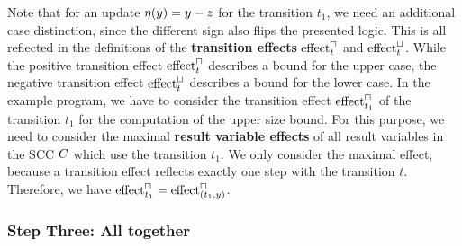 Note that for an update $\eta(y) = y - z$ for the transition $t_1$, we need an additional case distinction, since the different sign also flips the presented logic.
This is all reflected in the definitions of the \textbf{transition effects} $\text{effect}^\sqcap_t$ and $\text{effect}^\sqcup_t$.
While the positive transition effect $\text{effect}^\sqcap_t$ describes a bound for the upper case, the negative transition effect $\text{effect}^\sqcup_t$ describes a bound for the lower case.
In the example program, we have to consider the transition effect $\text{effect}^\sqcap_{t_1}$ of the transition $t_1$ for the computation of the upper size bound.
For this purpose, we need to consider the maximal \textbf{result variable effects} of all result variables in the SCC $C$ which use the transition $t_1$.
We only consider the maximal effect, because a transition effect reflects exactly one step with the transition $t$.
Therefore, we have $\text{effect}^\sqcap_{t_1} = \text{effect}^\sqcap_{(t_1,y)}$.


\subsubsection{Step Three: All together}

